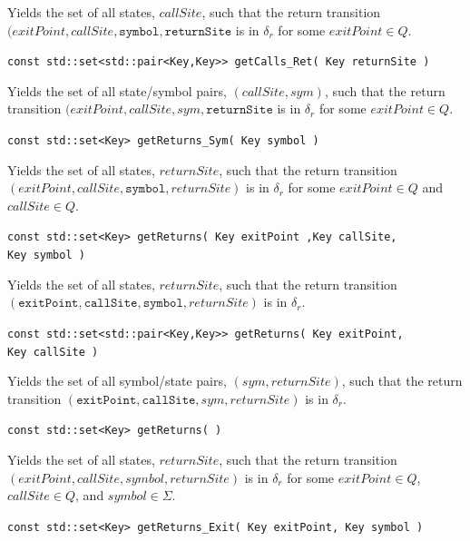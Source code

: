 \documentclass{llncs}
\begin{document}
\begin{description}
    Yields the set of all states, $callSite$, such that the return transition
    $(exitPoint,callSite,\texttt{symbol},\texttt{returnSite}$ is in
    $\delta_r$ for some $exitPoint \in Q$.

  \item\texttt{const std::set<std::pair<Key,Key>> getCalls\_Ret( Key returnSite )} \nopagebreak

    Yields the set of all state/symbol pairs, $(callSite,sym)$, such that the
    return transition $(exitPoint,callSite,sym,\texttt{returnSite}$ is in
    $\delta_r$ for some $exitPoint \in Q$.

  \item\texttt{const std::set<Key> getReturns\_Sym( Key symbol )} \nopagebreak

    Yields the set of all states, $returnSite$, such that the return
    transition $(exitPoint,callSite,\texttt{symbol},returnSite)$ is in
    $\delta_r$ for some $exitPoint \in Q$ and $callSite \in Q$.

  \item\texttt{const std::set<Key> getReturns( Key exitPoint ,Key callSite,\\ \hspace*{3.25cm} Key symbol )} \nopagebreak

    Yields the set of all states, $returnSite$, such that the return
    transition
    $(\texttt{exitPoint},\texttt{callSite},\texttt{symbol},returnSite)$ is in
    $\delta_r$.

  \item\texttt{const std::set<std::pair<Key,Key>> getReturns( Key exitPoint,\\ \hspace*{3.25cm} Key callSite )} \nopagebreak

    Yields the set of all symbol/state pairs, $(sym,returnSite)$, such that
    the return transition
    $(\texttt{exitPoint},\texttt{callSite},sym,returnSite)$ is in $\delta_r$.

  \item\texttt{const std::set<Key> getReturns( )} \nopagebreak

    Yields the set of all states, $returnSite$, such that the return
    transition $(exitPoint,callSite,symbol,returnSite)$ is in $\delta_r$ for
    some $exitPoint \in Q$, $callSite \in Q$, and $symbol \in \Sigma$.

  \item\texttt{const std::set<Key> getReturns\_Exit( Key exitPoint, Key symbol )} \nopagebreak


\end{description}
\end{document}
